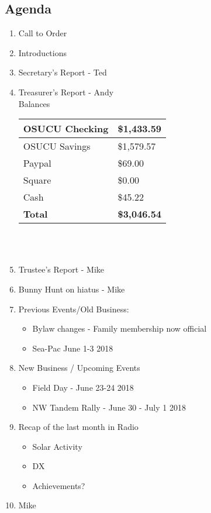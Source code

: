 \documentclass[letter,11pt]{extarticle}
\begin{document}
	\subsection*{Agenda}
	\begin{enumerate}
		\item Call to Order
		\item Introductions
		\item Secretary's Report - Ted
		\item Treasurer's Report - Andy \\
				Balances 
			\begin{tabular}{|l|l|} \hline
				OSUCU Checking & \$1,433.59 \\ \hline
				OSUCU Savings & \$1,579.57 \\ \hline
				Paypal & \$69.00 \\ \hline
				Square & \$0.00 \\ \hline
				Cash & \$45.22 \\ \hline
				\textbf{Total} & \textbf{\$3,046.54} \\ \hline
			\end{tabular} \\ \\
		\item Trustee's Report - Mike
		\item Bunny Hunt on hiatus - Mike
		\item Previous Events/Old Business:
		\begin{itemize}
			\item Bylaw changes - Family membership now official
			\item Sea-Pac June 1-3 2018 
		\end{itemize}
				
		\item  New Business / Upcoming Events
			\begin{itemize}
				\item Field Day - June 23-24 2018
				\item NW Tandem Rally - June 30 - July 1 2018
			\end{itemize}
		\item Recap of the last month in Radio
			\begin{itemize}
				\item Solar Activity
				\item DX
				\item Achievements?
			\end{itemize}
		\item  Mike
	\end{enumerate}
\end{document}
